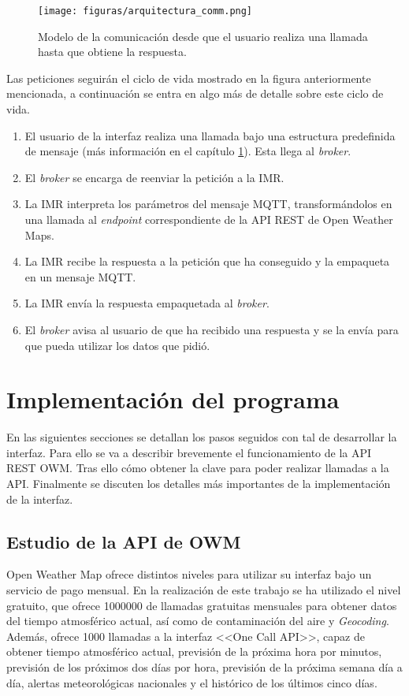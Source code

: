 \documentclass{scrbook}
\begin{document}
\begin{figure}[tbh] 
\begin{center}
\texttt{[image: figuras/arquitectura\_comm.png]}
\caption{Modelo de la comunicación desde que el usuario realiza una llamada hasta que obtiene la respuesta.} 
\label{fig:arquitectura_comm}
\end{center}
\end{figure}

Las peticiones seguirán el ciclo de vida mostrado en la figura anteriormente mencionada, a continuación se entra en algo más de detalle sobre este ciclo de vida.

\begin{enumerate}
    \item El usuario de la interfaz realiza una llamada bajo una estructura predefinida de mensaje (más información en el capítulo \ref{cap:implementación}). Esta llega al \textit{broker}.
    \item El \textit{broker} se encarga de reenviar la petición a la IMR.
    \item La IMR interpreta los parámetros del mensaje MQTT, transformándolos en una llamada al \textit{endpoint} correspondiente de la API REST de Open Weather Maps.
    \item La IMR recibe la respuesta a la petición que ha conseguido y la empaqueta en un mensaje MQTT.
    \item La IMR envía la respuesta empaquetada al \textit{broker}. 
    \item El \textit{broker} avisa al usuario de que ha recibido una respuesta y se la envía para que pueda utilizar los datos que pidió.
\end{enumerate}


\chapter{Implementación del programa}
\label{cap:implementación}

En las siguientes secciones se detallan los pasos seguidos con tal de desarrollar la interfaz. Para ello se va a describir brevemente el funcionamiento de la API REST OWM. Tras ello cómo obtener la clave para poder realizar llamadas a la API. Finalmente se discuten los detalles más importantes de la implementación de la interfaz.

\section{Estudio de la API de OWM}
Open Weather Map ofrece distintos niveles para utilizar su interfaz bajo un servicio de pago mensual. En la realización de este trabajo se ha utilizado el nivel gratuito, que  ofrece 1000000 de llamadas gratuitas mensuales para obtener datos del tiempo atmosférico actual, así como de contaminación del aire y \textit{Geocoding}. Además, ofrece 1000 llamadas a la interfaz <<One Call API>>, capaz de obtener tiempo atmosférico actual, previsión de la próxima hora por minutos, previsión de los próximos dos días por hora, previsión de la próxima semana día a día, alertas meteorológicas nacionales y el histórico de los últimos cinco días.
\end{document}
